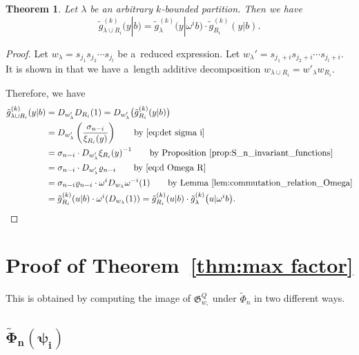 \documentclass[10pt,a4paper]{amsart}
\numberwithin{equation}{section}
\newcommand{\co}{\xi}
\newcommand{\la}{\lambda}
\newcommand{\de}{\varrho}
\newcommand{\fac}{\psi}
\newtheorem{Theorem}{Theorem}[section]
\theoremstyle{definition}
\begin{document}
\begin{Theorem}\label{thm:$k$-rect}
Let $\lambda$ be an arbitrary $k$-bounded partition.
Then we have
\[
\tilde{g}^{(k)}_{\lambda\cup R_i}(y|b)=
\tilde{g}^{(k)}_{\lambda}\bigl(y| \omega^{i}b\bigr)\cdot\tilde{g}^{(k)}_{R_i}(y|b).
\]
\end{Theorem}
\begin{proof}
Let $w_\lambda=s_{j_1}s_{j_2}\cdots s_{j_l}$ be a~reduced expression.
Let $w_\la'=s_{j_1+i}s_{j_2+i}\cdots s_{j_l+i}$.
It is shown in \cite[Lemma~2.15]{Tak} that we have a~length additive decomposition
$
w_{\la \cup R_i}=w'_\la w_{R_i}$.

Therefore, we have
\begin{align*}
\tilde{g}^{(k)}_{\lambda\cup R_i}(y|b)&=D_{w'_\la}D_{R_i}(1)=D_{w'_\la}\bigl(\tilde{g}^{(k)}_{R_i}(y|b)\bigr)
\\
&=D_{w'_\la}\left(\frac{\sigma_{n-i}}{\co_{R_i}(y)}\right)\qquad\text{by~\eqref{eq:det sigma i}}\\
&=\sigma_{n-i}\cdot D_{w'_\la}{\co_{R_i}(y)}^{-1}\qquad\text{by Proposition~\ref{prop:S_n_invariant_functions}}
\\
&=\sigma_{n-i}\cdot D_{w'_\la}\de_{n-i}\qquad\text{by~\eqref{eq:d Omega R}}\\
&=\sigma_{n-i} \de_{n-i}\cdot \omega^{i} D_{w_\la}\omega^{-i}(1)
\qquad\text{by Lemma~\ref{lem:commutation_relation_Omega}}
\\
&=\tilde{g}^{(k)}_{R_i}
(u|b)
\cdot \omega^{i}( D_{w_\la}(1))=\tilde{g}^{(k)}_{R_i}
(u|b)
\cdot \tilde{g}^{(k)}_{\la}
\bigl(u| \omega^i b\bigr).\tag*{\qed}
 \end{align*}\renewcommand{\qed}{}
\end{proof}



\section{Proof of Theorem~\ref{thm:max factor}}\label{sec:max factor}



This is obtained by computing the image of $\mathfrak{G}_{w_\circ}^Q$
under $\tilde{\Phi}_n$ in two different ways.

\subsection[Phi\_n(fac\_i)]{$\boldsymbol{\tilde{\Phi}_n(\fac_i)}$}
\end{document}
